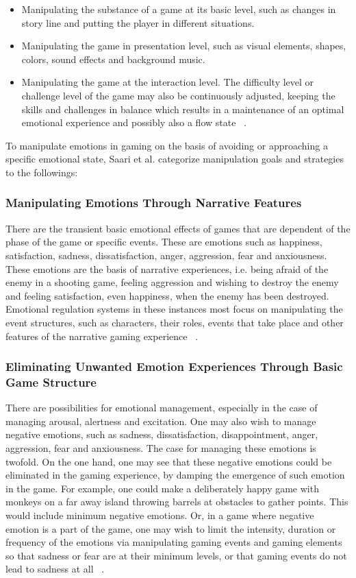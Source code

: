 \begin{itemize}
\item Manipulating the substance of a game at its basic level, such as changes in story line and putting the player in different situations.
\item Manipulating the game in presentation level, such as visual elements, shapes, colors, sound effects and background music.
\item Manipulating the game at the interaction level. The difficulty level or challenge level of the game may also be continuously adjusted, keeping the skills and challenges in balance which results in a maintenance of an optimal emotional experience and possibly also a flow state ~\cite{saari2005emotional}.
\end{itemize}

To manipulate emotions in gaming on the basis of avoiding or approaching a specific emotional state, Saari et al. categorize manipulation goals and strategies to the followings:

\subsubsection{Manipulating Emotions Through Narrative Features} There are the transient basic emotional effects of games that are dependent of the phase of the game or specific events. These are emotions such as happiness, satisfaction, sadness, dissatisfaction, anger, aggression, fear and anxiousness. These emotions are the basis of narrative experiences, i.e. being afraid of the enemy in a shooting game, feeling aggression and wishing to destroy the enemy and feeling satisfaction, even happiness, when the enemy has been destroyed. Emotional regulation systems in these instances most focus on manipulating the event structures, such as characters, their roles, events that take place and other features of the narrative gaming experience ~\cite{saari2005emotional}.

\subsubsection{Eliminating Unwanted Emotion Experiences Through Basic Game Structure} There are possibilities for emotional management, especially in the case of managing arousal, alertness and excitation. One may also wish to manage negative emotions, such as sadness, dissatisfaction, disappointment, anger, aggression, fear and anxiousness. The case for managing these emotions is twofold. On the one hand, one may see that these negative emotions could be eliminated in the gaming experience, by damping the emergence of such emotion in the game. For example, one could make a deliberately happy game with monkeys on a far away island throwing barrels at obstacles to gather points. This would include minimum negative emotions. Or, in a game where negative emotion is a part of the game, one may wish to limit the intensity, duration or frequency of the emotions via manipulating gaming events and gaming elements so that sadness or fear are at their minimum levels, or that gaming events do not lead to sadness at all ~\cite{saari2005emotional}.

